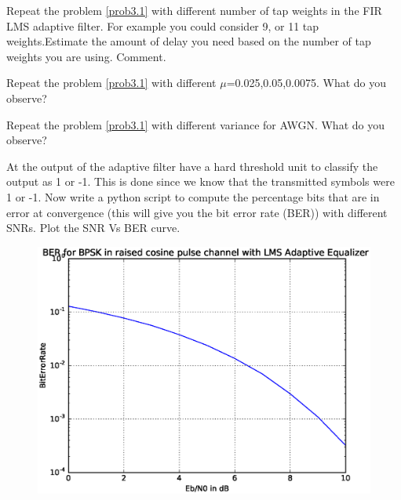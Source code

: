 \documentclass[journal,12pt,twocolumn]{IEEEtran}
\begin{document}
\begin{problem}
Repeat the problem \ref{prob3.1} with different number of tap weights in the FIR LMS adaptive filter. For example you could consider 9, or 11 tap weights.Estimate the amount of delay you need based on the number of tap weights you are using. Comment.\label{prob3.2}
\end{problem}
\begin{problem}
Repeat the problem \ref{prob3.1} with different $\mu$=0.025,0.05,0.0075. What do you observe? \label{prob3.3}
\end{problem}

\begin{problem}
Repeat the problem \ref{prob3.1} with different variance for AWGN. What do you observe? \label{prob3.3}
\end{problem}
\begin{problem}
At the output of the adaptive filter have a hard threshold unit to classify the output as 1 or -1. This is done since we know that the transmitted symbols were 1 or -1. Now write a python script to compute the percentage bits that are in error at convergence (this will give you the bit error rate (BER)) with different SNRs. Plot the SNR Vs BER curve.
\end{problem}
\solution
	  
\begin{center}
\begin{figure}
\centering
\includegraphics[width=\columnwidth]{SNR_Vs_BER.eps}
\caption{}
\label{fig:f3}
\end{figure}
\end{center}
\end{document}
